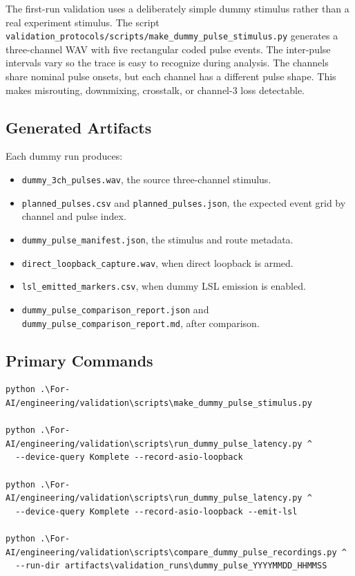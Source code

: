 \documentclass[11pt]{article}
\begin{document}
The first-run validation uses a deliberately simple dummy stimulus rather than
a real experiment stimulus. The script
\texttt{validation\_protocols/scripts/make\_dummy\_pulse\_stimulus.py}
generates a three-channel WAV with five rectangular coded pulse events. The
inter-pulse intervals vary so the trace is easy to recognize during analysis.
The channels share nominal pulse onsets, but each channel has a different pulse
shape. This makes misrouting, downmixing, crosstalk, or channel-3 loss
detectable.

\subsection{Generated Artifacts}

Each dummy run produces:

\begin{itemize}
  \item \texttt{dummy\_3ch\_pulses.wav}, the source three-channel stimulus.
  \item \texttt{planned\_pulses.csv} and \texttt{planned\_pulses.json}, the
  expected event grid by channel and pulse index.
  \item \texttt{dummy\_pulse\_manifest.json}, the stimulus and route metadata.
  \item \texttt{direct\_loopback\_capture.wav}, when direct loopback is armed.
  \item \texttt{lsl\_emitted\_markers.csv}, when dummy LSL emission is enabled.
  \item \texttt{dummy\_pulse\_comparison\_report.json} and
  \texttt{dummy\_pulse\_comparison\_report.md}, after comparison.
\end{itemize}

\subsection{Primary Commands}

\begin{verbatim}
python .\For-AI/engineering/validation\scripts\make_dummy_pulse_stimulus.py

python .\For-AI/engineering/validation\scripts\run_dummy_pulse_latency.py ^
  --device-query Komplete --record-asio-loopback

python .\For-AI/engineering/validation\scripts\run_dummy_pulse_latency.py ^
  --device-query Komplete --record-asio-loopback --emit-lsl

python .\For-AI/engineering/validation\scripts\compare_dummy_pulse_recordings.py ^
  --run-dir artifacts\validation_runs\dummy_pulse_YYYYMMDD_HHMMSS
\end{verbatim}
\end{document}
